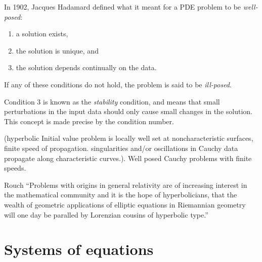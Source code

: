 In 1902, Jacques Hadamard defined what it meant for a PDE problem to be \textit{well-posed}:
\begin{enumerate}
\item a solution exists,
\item the solution is unique, and
\item the solution depends continually on the data.
\end{enumerate}
If any of these conditions do not hold, the problem is said to be \textit{ill-posed}.

Condition 3 is known as the \textit{stability} condition, and means that small perturbations in the input data should only cause small changes in the solution. This concept is made precise by the condition number. 

 (hyperbolic Initial value problem is locally well set at noncharacteristic surfaces, finite speed of propagation. singularities and/or oscillations in Cauchy data propagate along characteristic curves.). Well posed Cauchy problems with finite speeds.

Rouch "`Problems with origins in general relativity are of increasing interest in the mathematical community
and it is the hope of hyperbolicians, that the wealth of geometric applications of elliptic equations
in Riemannian geometry will one day be paralled by Lorenzian cousins of hyperbolic type."'


\section{Systems of equations}

